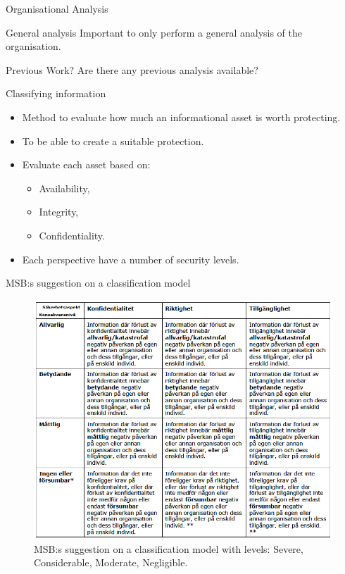\documentclass{beamer}
\begin{document}
\begin{frame}{Organisational Analysis}
  \begin{block}{General analysis}
    Important to only perform a general analysis of the organisation.
  \end{block}
  \begin{block}{Previous Work?}
    Are there any previous analysis available?
  \end{block}
\end{frame}

\begin{frame}{Classifying information}
  \begin{itemize}
    \item Method to evaluate how much an informational asset is worth
      protecting.

    \item To be able to create a suitable protection.

    \item Evaluate each asset based on:
      \begin{itemize}
        \item Availability,
        \item Integrity,
        \item Confidentiality.
      \end{itemize}

    \item Each perspective have a number of security levels.

  \end{itemize}
\end{frame}

\begin{frame}{MSB:s suggestion on a classification model}
  \begin{figure}
    \includegraphics[height=0.7\textheight]{Figures/msb-klassificering.png}
    \caption{MSB:s suggestion on a classification model with levels: Severe, Considerable,
      Moderate, Negligible.}
  \end{figure}
\end{frame}
\end{document}
